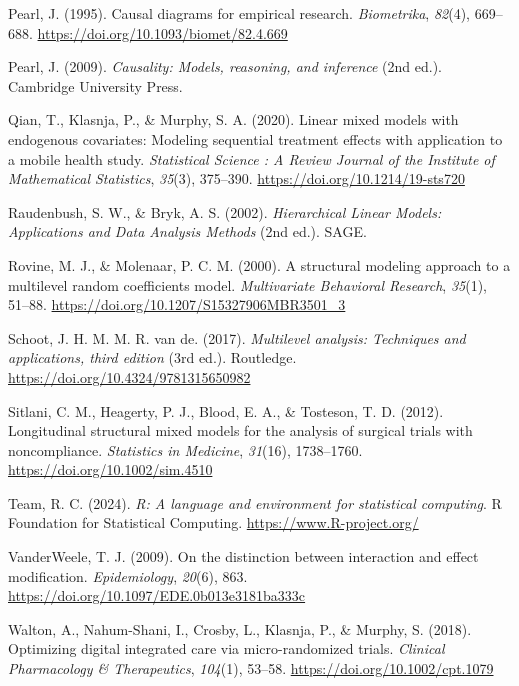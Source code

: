 \documentclass[
  11pt,
  a4paper,
]{article}
\newlength{\cslhangindent}
\newenvironment{CSLReferences}[2] %
 {\begin{list}{}{%
  \setlength{\itemindent}{0pt}
  \setlength{\leftmargin}{0pt}
  \setlength{\parsep}{0pt}
  \ifodd #1
   \setlength{\leftmargin}{\cslhangindent}
   \setlength{\itemindent}{-1\cslhangindent}
  \fi
  \setlength{\itemsep}{#2\baselineskip}}}
 {\end{list}}
\begin{document}
\begin{CSLReferences}{1}{0}
Pearl, J. (1995). Causal diagrams for empirical research.
\emph{Biometrika}, \emph{82}(4), 669--688.
\url{https://doi.org/10.1093/biomet/82.4.669}

Pearl, J. (2009). \emph{Causality: Models, reasoning, and inference}
(2nd ed.). Cambridge University Press.

Qian, T., Klasnja, P., \& Murphy, S. A. (2020). Linear mixed models with
endogenous covariates: Modeling sequential treatment effects with
application to a mobile health study. \emph{Statistical Science : A
Review Journal of the Institute of Mathematical Statistics},
\emph{35}(3), 375--390. \url{https://doi.org/10.1214/19-sts720}

Raudenbush, S. W., \& Bryk, A. S. (2002). \emph{Hierarchical Linear
Models: Applications and Data Analysis Methods} (2nd ed.). SAGE.

Rovine, M. J., \& Molenaar, P. C. M. (2000). A structural modeling
approach to a multilevel random coefficients model. \emph{Multivariate
Behavioral Research}, \emph{35}(1), 51--88.
\url{https://doi.org/10.1207/S15327906MBR3501_3}

Schoot, J. H. M. M. R. van de. (2017). \emph{Multilevel analysis:
Techniques and applications, third edition} (3rd ed.). Routledge.
\url{https://doi.org/10.4324/9781315650982}

Sitlani, C. M., Heagerty, P. J., Blood, E. A., \& Tosteson, T. D.
(2012). Longitudinal structural mixed models for the analysis of
surgical trials with noncompliance. \emph{Statistics in Medicine},
\emph{31}(16), 1738--1760. \url{https://doi.org/10.1002/sim.4510}

Team, R. C. (2024). \emph{R: A language and environment for statistical
computing}. R Foundation for Statistical Computing.
\url{https://www.R-project.org/}

VanderWeele, T. J. (2009). On the distinction between interaction and
effect modification. \emph{Epidemiology}, \emph{20}(6), 863.
\url{https://doi.org/10.1097/EDE.0b013e3181ba333c}

Walton, A., Nahum-Shani, I., Crosby, L., Klasnja, P., \& Murphy, S.
(2018). Optimizing digital integrated care via micro-randomized trials.
\emph{Clinical Pharmacology \& Therapeutics}, \emph{104}(1), 53--58.
\url{https://doi.org/10.1002/cpt.1079}


\end{CSLReferences}
\end{document}

